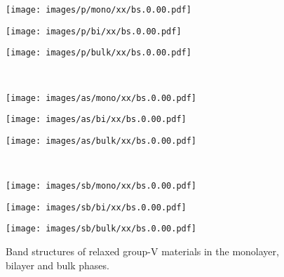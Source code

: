  
\begin{figure}[htb!]
\centering
\begin{subfloat}[Monolayer P]{
\texttt{[image: images/p/mono/xx/bs.0.00.pdf]}}
\end{subfloat}
\begin{subfloat}[Bilayer P]{
\texttt{[image: images/p/bi/xx/bs.0.00.pdf]}}
\end{subfloat}
\begin{subfloat}[Bulk P]{
\texttt{[image: images/p/bulk/xx/bs.0.00.pdf]}}
\end{subfloat}
\\
\begin{subfloat}[Monolayer As]{
\texttt{[image: images/as/mono/xx/bs.0.00.pdf]}}
\end{subfloat}
\begin{subfloat}[Bilayer As]{
\texttt{[image: images/as/bi/xx/bs.0.00.pdf]}}
\end{subfloat}
\begin{subfloat}[Bulk As]{
\texttt{[image: images/as/bulk/xx/bs.0.00.pdf]}}
\end{subfloat}
\\
\begin{subfloat}[Monolayer Sb]{
\texttt{[image: images/sb/mono/xx/bs.0.00.pdf]}}
\end{subfloat}
\begin{subfloat}[Bilayer Sb]{
\texttt{[image: images/sb/bi/xx/bs.0.00.pdf]}}
\end{subfloat}
\begin{subfloat}[Bulk Sb]{
\texttt{[image: images/sb/bulk/xx/bs.0.00.pdf]}}
\end{subfloat}
\label{fig:relaxed_bandstructures}
\caption[Band structures of relaxed group-V phases]
{Band structures of relaxed group-V materials 
in the monolayer, bilayer and bulk phases.}
\end{figure}
 
